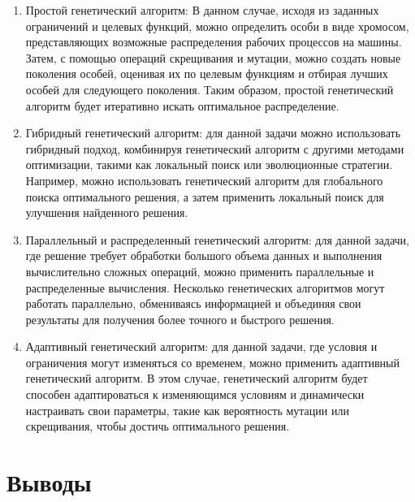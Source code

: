 \begin{enumerate}
	\item Простой генетический алгоритм:
	В данном случае, исходя из заданных ограничений и целевых функций, можно определить особи в виде хромосом, представляющих возможные распределения рабочих процессов на машины. 
	Затем, с помощью операций скрещивания и мутации, можно создать новые поколения особей, оценивая их по целевым функциям и отбирая лучших особей для следующего поколения. 
	Таким образом, простой генетический алгоритм будет итеративно искать оптимальное распределение.
	\item Гибридный генетический алгоритм: 
	для данной задачи можно использовать гибридный подход, комбинируя генетический алгоритм с другими методами оптимизации, такими как локальный поиск или эволюционные стратегии. 
	Например, можно использовать генетический алгоритм для глобального поиска оптимального решения, а затем применить локальный поиск для улучшения найденного решения.
	\item Параллельный и распределенный генетический алгоритм: 
	для данной задачи, где решение требует обработки большого объема данных и выполнения вычислительно сложных операций, можно применить параллельные и распределенные вычисления. 
	Несколько генетических алгоритмов могут работать параллельно, обмениваясь информацией и объединяя свои результаты для получения более точного и быстрого решения.
	\item Адаптивный генетический алгоритм: 
	для данной задачи, где условия и ограничения могут изменяться со временем, можно применить адаптивный генетический алгоритм. 
	В этом случае, генетический алгоритм будет способен адаптироваться к изменяющимся условиям и динамически настраивать свои параметры, такие как вероятность мутации или скрещивания, чтобы достичь оптимального решения.
\end{enumerate}

\section{Выводы}

